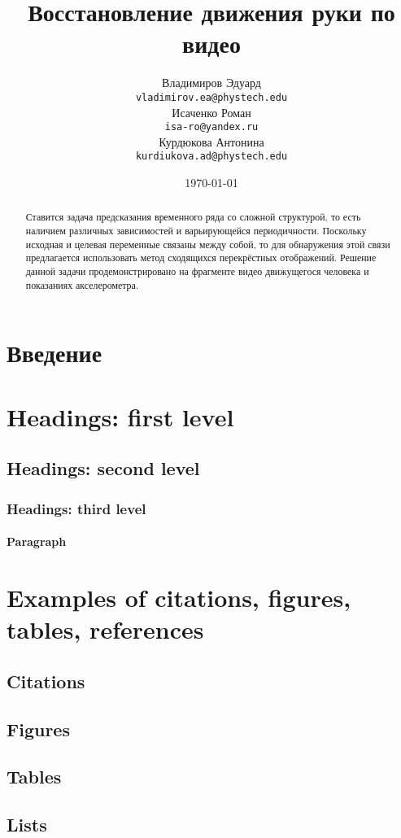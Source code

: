 \documentclass{article}
\title{Восстановление движения руки по видео}
\author{Владимиров Эдуард \\
	\texttt{vladimirov.ea@phystech.edu} \\

	\And
	Исаченко Роман \\
	\texttt{isa-ro@yandex.ru} \\
	
	\And
	Курдюкова Антонина \\
	\texttt{kurdiukova.ad@phystech.edu} \\
}
\date{\today}
\begin{document}
\maketitle

\begin{abstract}
	Ставится задача предсказания временного ряда со сложной структурой, то есть наличием различных зависимостей и 
	варьирующейся периодичности. Поскольку исходная и целевая переменные связаны между собой, то 
	для обнаружения этой связи предлагается использовать метод сходящихся перекрёстных отображений. Решение 
	данной задачи продемонстрировано на фрагменте видео движущегося человека и показаниях акселерометра.
\end{abstract}



\section{Введение}

\section{Headings: first level}

\subsection{Headings: second level}

\subsubsection{Headings: third level}

\paragraph{Paragraph}


\section{Examples of citations, figures, tables, references}

\subsection{Citations}

\subsection{Figures}


\subsection{Tables}

\subsection{Lists}




\end{document}
